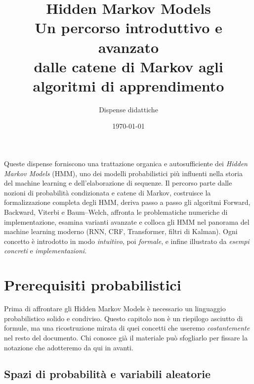 \documentclass[11pt,a4paper,oneside]{book}
\title{\Huge \textbf{Hidden Markov Models}\\[0.4em]
       \Large Un percorso introduttivo e avanzato\\
       dalle catene di Markov agli algoritmi di apprendimento}
\author{Dispense didattiche}
\date{\today}
\theoremstyle{plain}
\theoremstyle{definition}
\theoremstyle{remark}
\begin{document}

\frontmatter
\maketitle

\begin{center}
\vspace*{1cm}
\begin{tcolorbox}[notebox,title=Sinossi del documento,width=0.85\textwidth]
Queste dispense forniscono una trattazione organica e autosufficiente dei
\emph{Hidden Markov Models} (HMM), uno dei modelli probabilistici più
influenti nella storia del machine learning e dell'elaborazione di
sequenze. Il percorso parte dalle nozioni di probabilità condizionata e
catene di Markov, costruisce la formalizzazione completa degli HMM,
deriva passo a passo gli algoritmi Forward, Backward, Viterbi e
Baum--Welch, affronta le problematiche numeriche di implementazione,
esamina varianti avanzate e colloca gli HMM nel panorama del machine
learning moderno (RNN, CRF, Transformer, filtri di Kalman). Ogni
concetto è introdotto in modo \emph{intuitivo}, poi \emph{formale},
e infine illustrato da \emph{esempi concreti} e \emph{implementazioni}.
\end{tcolorbox}
\end{center}

\tableofcontents

\mainmatter

\chapter{Prerequisiti probabilistici}
\label{ch:prereq}

Prima di affrontare gli Hidden Markov Models è necessario un linguaggio
probabilistico solido e condiviso. Questo capitolo non è un riepilogo
asciutto di formule, ma una ricostruzione mirata di quei concetti che
useremo \emph{costantemente} nel resto del documento. Chi conosce già
il materiale può sfogliarlo per fissare la notazione che adotteremo da
qui in avanti.

\section{Spazi di probabilità e variabili aleatorie}
\end{document}
